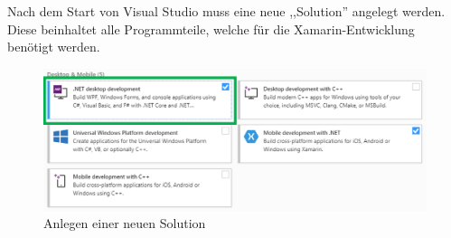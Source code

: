 Nach dem Start von Visual Studio muss eine neue ,,Solution'' angelegt werden. Diese beinhaltet alle Programmteile, welche für die Xamarin-Entwicklung benötigt werden. 

\begin{figure}[H]
    \centering\includegraphics[width=0.9\linewidth]{images/auswahl_rahmenwerk/installation2.png}    
    \caption{Anlegen einer neuen Solution}
\end{figure}

